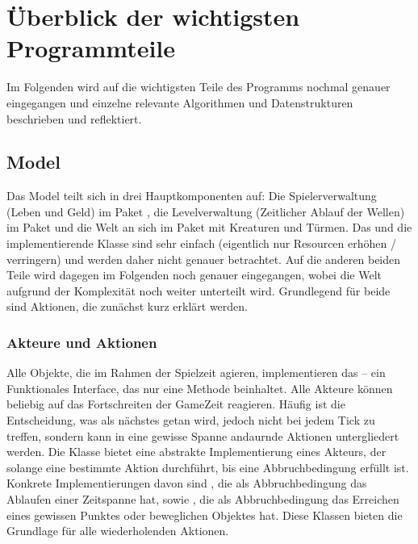 \section{Überblick der wichtigsten Programmteile} %
\label{sec:überblick_der_wichtigsten_programmteile}

Im Folgenden wird auf die wichtigsten Teile des Programms nochmal genauer eingegangen und einzelne relevante Algorithmen und Datenstrukturen beschrieben und reflektiert.

\subsection{Model} %
\label{sub:model}
Das Model teilt sich in drei Hauptkomponenten auf: Die Spielerverwaltung (Leben und Geld) im Paket , die Levelverwaltung (Zeitlicher Ablauf der Wellen) im Paket  und die Welt an sich im Paket  mit Kreaturen und Türmen. Das  und die implementierende Klasse  sind sehr einfach (eigentlich nur Resourcen erhöhen / verringern) und werden daher nicht genauer betrachtet. Auf die anderen beiden Teile wird dagegen im Folgenden noch genauer eingegangen, wobei die Welt aufgrund der Komplexität noch weiter unterteilt wird. Grundlegend für beide sind Aktionen, die zunächst kurz erklärt werden.

\subsubsection{Akteure und Aktionen} %
\label{ssub:aktionen}
Alle Objekte, die im Rahmen der Spielzeit agieren, implementieren das  -- ein Funktionales Interface, das nur eine Methode  beinhaltet. Alle Akteure können beliebig auf das Fortschreiten der GameZeit reagieren. Häufig ist die Entscheidung, was als nächstes getan wird, jedoch nicht bei jedem Tick zu treffen, sondern kann in eine gewisse Spanne andaurnde Aktionen untergliedert werden. Die Klasse  bietet eine abstrakte Implementierung eines Akteurs, der solange eine bestimmte Aktion durchführt, bis eine Abbruchbedingung erfüllt ist. Konkrete Implementierungen davon sind , die als Abbruchbedingung das Ablaufen einer Zeitspanne hat, sowie , die als Abbruchbedingung das Erreichen eines gewissen Punktes oder beweglichen Objektes hat. Diese Klassen bieten die Grundlage für alle wiederholenden Aktionen.
